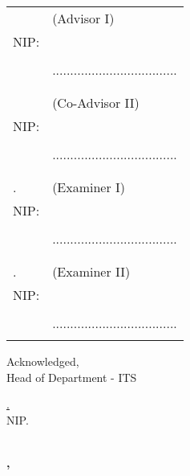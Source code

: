  \noindent
 \begin{tabularx}{\textwidth}{X l}
   \advisor{}              & (Advisor I)                         \\
   NIP: \advisornip{}      &                                     \\
                           &                                     \\
                           & ................................... \\
                           &                                     \\
                           &                                     \\
   \coadvisor{}            & (Co-Advisor II)                     \\
   NIP: \coadvisornip{}    &                                     \\
                           &                                     \\
                           & ................................... \\
                           &                                     \\
                          &                                     \\
  \examinerone{}.         & (Examiner I)                        \\
  NIP: \examineronenip{}  &                                     \\
                          &                                     \\
                          & ................................... \\
                          &                                     \\
                          &                                     \\
  \examinertwo{}.         & (Examiner II)                       \\
  NIP: \examinertwonip{}  &                                     \\
                          &                                     \\
                          & ................................... \\
                          &                                     \\
\end{tabularx}
\endgroup


\begin{center}
  Acknowledged, \\
  Head of \engdepartment{} Department \engfacultyshort{} - ITS \\

  \vspace{8ex}

  \underline{\headofdepartment{}.} \\
  NIP. \headofdepartmentnip{}
\end{center}

\begin{center}
  \textbf{\MakeUppercase{\place{}}\\\ENGMONTH{}, \the\year{}}
\end{center}
\endgroup

